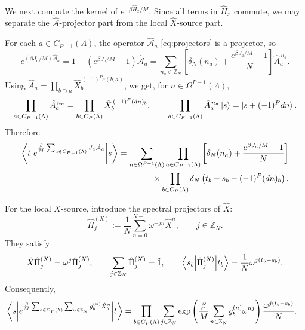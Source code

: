We next compute the kernel of \(e^{-\beta\hat H_x/M}\). Since all terms in \(\hat H_x\)
commute, we may separate the \(\hat{\mathcal A}\)-projector part from the local
\(\hat X\)-source part.

For each \(a\in C_{P-1}(\Lambda)\), the operator \(\hat{\mathcal A}_a\) \eqref{eq:projectors} is a projector, so
\begin{equation}
	e^{(\beta J_a/M)\hat{\mathcal A}_a}
	=
	1+\left(e^{\beta J_a/M}-1\right)\hat{\mathcal A}_a
	=
	\sum_{n_a\in\mathbb Z_N}
	\left[
	\delta_N(n_a)+\frac{e^{\beta J_a/M}-1}{N}
	\right]
	\hat A_a^{\,n_a}.
	\label{eq:projector-exp-sum}
\end{equation}
Using $\hat A_a=\prod_{b\supset a}\hat X_b^{\,(-1)^P\varepsilon(b,a)}$,
we get, for \(n\in\Omega^{P-1}(\Lambda)\),
\begin{equation}
	\prod_{a\in C_{P-1}(\Lambda)}\hat A_a^{\,n_a}
	=
	\prod_{b\in C_P(\Lambda)}
	\hat X_b^{\,(-1)^P(dn)_b},
	\qquad
	\prod_{a\in C_{P-1}(\Lambda)}\hat A_a^{\,n_a}\ket{s}
	=
	\ket{s+(-1)^Pdn}.
	\label{eq:A-product-dn}
\end{equation}
Therefore
\begin{equation}
	\begin{aligned}
		\left\langle t \middle| 
			e^{\frac{\beta}{M}\sum_{a\in C_{P-1}(\Lambda)}J_a\hat{\mathcal A}_a}
		 \middle| s \right\rangle
		=
		\sum_{n\in\Omega^{P-1}(\Lambda)}
		\prod_{a\in C_{P-1}(\Lambda)}
		\left[
		\delta_N(n_a)+\frac{e^{\beta J_a/M}-1}{N}
		\right]
		\\
		\times
		\prod_{b\in C_P(\Lambda)}
		\delta_N\left(t_b-s_b-(-1)^P(dn)_b\right).
	\end{aligned}
	\label{eq:HA-kernel}
\end{equation}

For the local \(X\)-source, introduce the spectral projectors of \(\hat X\):
\begin{equation}
	\hat\Pi_j^{(X)}
	:=
	\frac1N\sum_{n=0}^{N-1}\omega^{-jn}\hat X^n,
	\qquad
	j\in\mathbb Z_N.
	\label{eq:X-projectors}
\end{equation}
They satisfy
\begin{equation}
	\hat X\hat\Pi_j^{(X)}=\omega^j\hat\Pi_j^{(X)},
	\qquad
	\sum_{j\in\mathbb Z_N}\hat\Pi_j^{(X)}=\hat 1,
	\qquad
	\left\langle s_b \middle| \hat\Pi_j^{(X)} \middle| t_b \right\rangle
	=
	\frac1N\omega^{j(t_b-s_b)}.
	\label{eq:PiX-proj}
\end{equation}
Consequently,
\begin{align}
	&\left\langle s \middle| 
		e^{\frac{\beta}{M}\sum_{b\in C_P(\Lambda)}
			\sum_{n\in\mathbb Z_N}g_b^{(n)}\hat X_b^n}
	 \middle| t \right\rangle
	=
	\prod_{b\in C_P(\Lambda)}
	\sum_{j\in\mathbb Z_N}
	\exp\left(
	\frac{\beta}{M}\sum_{n\in\mathbb Z_N}g_b^{(n)}\omega^{nj}
	\right)
	\frac{\omega^{j(t_b-s_b)}}{N}.
	\label{eq:HXsource-kernel}
\end{align}

